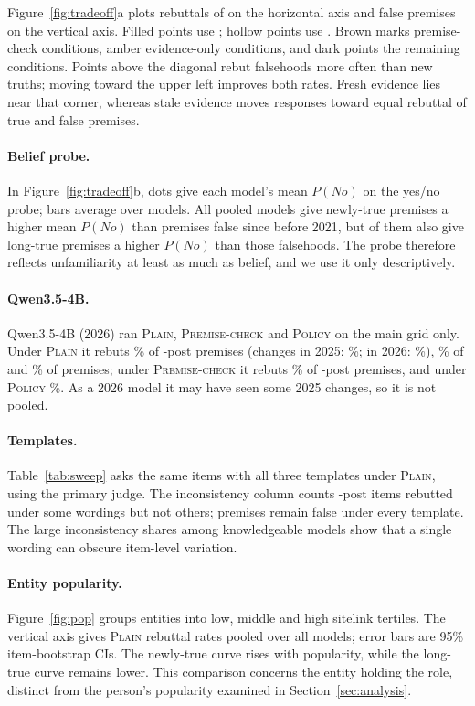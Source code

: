 Figure~\ref{fig:tradeoff}a plots rebuttals of \NEW{} on the horizontal axis and false premises on the vertical axis. Filled points use \ANC{}; hollow points use \SWP{}. Brown marks premise-check conditions, amber evidence-only conditions, and dark points the remaining conditions. Points above the diagonal rebut falsehoods more often than new truths; moving toward the upper left improves both rates. Fresh evidence lies near that corner, whereas stale evidence moves responses toward equal rebuttal of true and false premises.

\paragraph{Belief probe.}
In Figure~\ref{fig:tradeoff}b, dots give each model's mean $P(\textit{No})$ on the yes/no probe; bars average over models. All \VBeliefPoolN{} pooled models give newly-true premises a higher mean $P(\textit{No})$ than premises false since before 2021, but \VBeliefPoolOldGt{} of them also give long-true premises a higher $P(\textit{No})$ than those falsehoods. The probe therefore reflects unfamiliarity at least as much as belief, and we use it only descriptively.

\paragraph{Qwen3.5-4B.}
Qwen3.5-4B (2026) ran \textsc{Plain}, \textsc{Premise-check} and \textsc{Policy} on the main grid only. Under \textsc{Plain} it rebuts \WQtfNew\% of \NEW{}-post premises (changes in 2025: \WQtfNewTwentyFive\%; in 2026: \WQtfNewTwentySix\%), \WQtfOld\% of \OLD{} and \WQtfStre\% of \STRE{} premises; under \textsc{Premise-check} it rebuts \WQtfNewPrem\% of \NEW{}-post premises, and under \textsc{Policy} \WQtfNewPol\%. As a 2026 model it may have seen some 2025 changes, so it is not pooled.

\paragraph{Templates.}
Table~\ref{tab:sweep} asks the same items with all three templates under \textsc{Plain}, using the primary judge. The inconsistency column counts \NEW{}-post items rebutted under some wordings but not others; \NEV{} premises remain false under every template. The large inconsistency shares among knowledgeable models show that a single wording can obscure item-level variation.

\paragraph{Entity popularity.}
Figure~\ref{fig:pop} groups entities into low, middle and high sitelink tertiles. The vertical axis gives \textsc{Plain} rebuttal rates pooled over all models; error bars are 95\% item-bootstrap CIs. The newly-true curve rises with popularity, while the long-true curve remains lower. This comparison concerns the entity holding the role, distinct from the person's popularity examined in Section~\ref{sec:analysis}.

